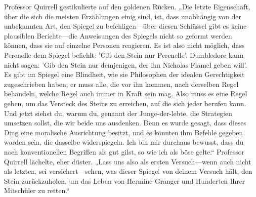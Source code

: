 Professor Quirrell gestikulierte auf den goldenen Rücken.
„Die letzte Eigenschaft, über die sich die meisten Erzählungen einig sind, ist, dass unabhängig von der unbekannten Art, den Spiegel zu befehligen—über diesen Schlüssel gibt es keine plausiblen Berichte—die Anweisungen des Spiegels nicht so geformt werden können, dass sie auf einzelne Personen reagieren. Es ist also nicht möglich, dass Perenelle dem Spiegel befiehlt: 'Gib den Stein nur Perenelle'. Dumbledore kann nicht sagen: 'Gib den Stein nur demjenigen, der ihn Nicholas Flamel geben will'. Es gibt im Spiegel eine Blindheit, wie sie Philosophen der idealen Gerechtigkeit zugeschrieben haben; er muss alle, die vor ihn kommen, nach derselben Regel behandeln, welche Regel auch immer in Kraft sein mag. Also muss es eine Regel geben, um das Versteck des Steins zu erreichen, auf die sich jeder berufen kann. Und jetzt siehst du, warum du, genannt der Junge-der-lebte, die Strategien umsetzen sollst, die wir beide uns ausdenken. Denn es wurde gesagt, dass dieses Ding eine moralische Ausrichtung besitzt, und es könnten ihm Befehle gegeben worden sein, die dasselbe widerspiegeln. Ich bin mir durchaus bewusst, dass du nach konventionellen Begriffen als gut gilst, so wie ich als böse gelte.“ Professor Quirrell lächelte, eher düster. „Lass uns also als ersten Versuch—wenn auch nicht als letzten, sei versichert—sehen, was dieser Spiegel von deinem Versuch hält, den Stein zurückzuholen, um das Leben von Hermine Granger und Hunderten Ihrer Mitschüler zu retten.“

